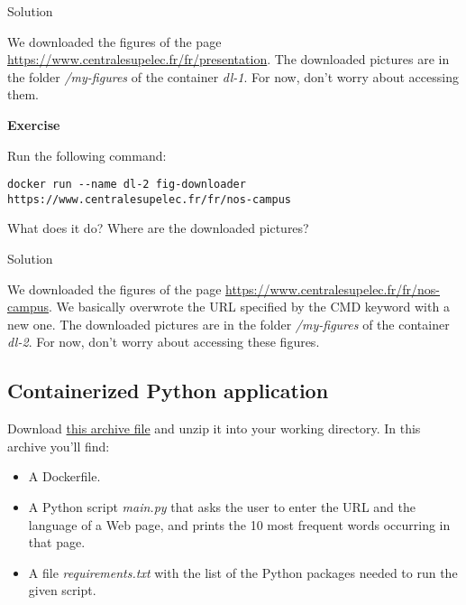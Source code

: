 \documentclass[
]{article}
\providecommand{\tightlist}{%
  \setlength{\itemsep}{0pt}\setlength{\parskip}{0pt}}
\newenvironment{infobox}[1]
  {
  \begin{itemize}
  \renewcommand{\labelitemi}{
    \raisebox{-.7\height}[0pt][0pt]{
      
    }
  }
  \setlength{\fboxsep}{1em}
  \begin{whitebox}
  \item
  }
  {
  \end{whitebox}
  \end{itemize}
  }
\theoremstyle{definition}
\theoremstyle{definition}
\theoremstyle{definition}
\theoremstyle{remark}
\let\BeginKnitrBlock\begin \let\EndKnitrBlock\end
\begin{document}
Solution

\begin{infobox}{exercisebox}

We downloaded the figures
of the page \url{https://www.centralesupelec.fr/fr/presentation}.
The downloaded pictures are in the folder \emph{/my-figures}
of the container \emph{dl-1}.
For now, don't worry about accessing them.

\end{infobox}

\begin{infobox}{exercisebox}

\textbf{Exercise}

\BeginKnitrBlock{exercise}
\protect\hypertarget{exr:unnamed-chunk-18}{}{\label{exr:unnamed-chunk-18} }Run the following command:

\begin{verbatim}
docker run --name dl-2 fig-downloader https://www.centralesupelec.fr/fr/nos-campus
\end{verbatim}

What does it do? Where are the downloaded pictures?
\EndKnitrBlock{exercise}

\end{infobox}

Solution

\begin{infobox}{exercisebox}

We downloaded the figures
of the page \url{https://www.centralesupelec.fr/fr/nos-campus}.
We basically overwrote the URL specified by the CMD keyword with a new
one.
The downloaded pictures are in the folder \emph{/my-figures}
of the container \emph{dl-2}.
For now, don't worry about accessing these figures.

\end{infobox}

\hypertarget{containerized-python-application}{%
\subsection{Containerized Python application}\label{containerized-python-application}}

Download \href{/courses/cloud-computing/word-frequency.zip}{this archive file}
and unzip it into your working directory.
In this archive you'll find:

\begin{itemize}
\tightlist
\item
  A Dockerfile.
\item
  A Python script \emph{main.py} that asks the user to enter the URL and the language of a Web page,
  and prints the 10 most frequent words occurring in that page.
\item
  A file \emph{requirements.txt} with the list of the Python packages
  needed to run the given script.
\end{itemize}
\end{document}

